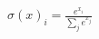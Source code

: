 \documentclass[preview]{standalone}
\begin{document}
\begin{align*}
\sigma(x)_i = \frac{e^{x_i}}{\sum_j e^{x_j}}
\end{align*}
\end{document}
